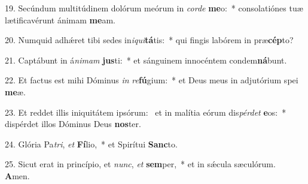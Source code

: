 19. Secúndum multitúdinem dolórum meórum in \textit{cor}\textit{de} \textbf{me}o:~*  consolatiónes tuæ lætificavérunt ánimam \textbf{me}am.\

20. Numquid adhǽret tibi sedes in\textit{i}\textit{qui}\textbf{tá}tis:~*  qui fingis labórem in præ\textbf{cép}to?\

21. Captábunt in á\textit{ni}\textit{mam} \textbf{jus}ti:~*  et sánguinem innocéntem condem\textbf{ná}bunt.\

22. Et factus est mihi Dóminus \textit{in} \textit{re}\textbf{fú}gium:~*  et Deus meus in adjutórium spei \textbf{me}æ.\

23. Et reddet illis iniquitátem ipsórum: \dag\  et in malítia eórum dis\textit{pér}\textit{det} \textbf{e}os:~*  dispérdet illos Dóminus Deus \textbf{nos}ter.\

24. Glória Pa\textit{tri}, \textit{et} \textbf{Fí}lio,~*  et Spirítui \textbf{Sanc}to.\

25. Sicut erat in princípio, et \textit{nunc}, \textit{et} \textbf{sem}per,~*  et in sǽcula sæculórum. \textbf{A}men.\

